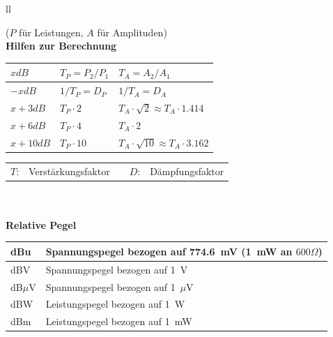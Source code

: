 \begin{tabular}{ll}
{		\small{($P$ für Leistungen, $A$ für Amplituden)}
		\\ 
		
		\textbf{Hilfen zur Berechnung}\\
		\begin{tabular}{|l|ll|}
			\hline
			$x dB$	& $T_P=P_2/P_1$ &$T_A=A_2/A_1$ \\
			\hline
			$-x dB$	& $1/T_P = D_P$	& $1/T_A = D_A$\\
			$x+3dB$	& $T_P \cdot 2$	& $T_A \cdot \sqrt{2} \approx T_A \cdot 1.414$ \\
			$x+6dB$ & $T_P \cdot 4$ & $T_A \cdot 2$ \\
			$x+10dB$	& $T_P \cdot 10$ & $T_A \cdot \sqrt{10} \approx T_A \cdot 3.162$\\
			\hline
		\end{tabular}
		\begin{tabular}{lllll}
			$T$: & Verstärkungsfaktor & &
			$D$: & Dämpfungsfaktor
		\end{tabular}
		\\ \\
		
		\textbf{Relative Pegel}\\
		\begin{tabular}{|l|l|}
			\hline
			dBu & Spannungspegel bezogen auf 774.6~mV (1~mW an $600\Omega$)\\
			\hline
			\hline
			dBV & Spannungspegel bezogen auf 1~V\\
			\hline
			dB$\mu$V & Spannungspegel bezogen auf 1~$\mu$V\\
			\hline
			dBW & Leistungspegel bezogen auf 1~W\\
			\hline
			dBm & Leistungspegel bezogen auf 1~mW\\
			\hline
		\end{tabular}		
	}
\end{tabular}
\newpage

